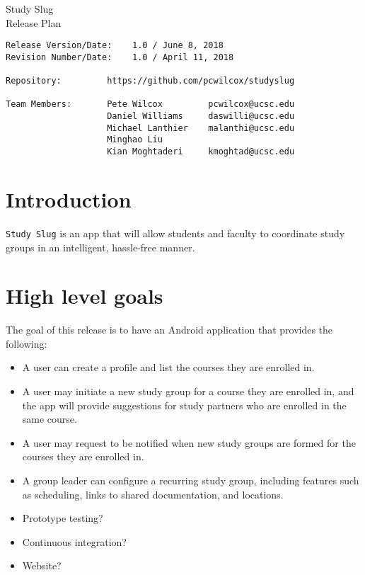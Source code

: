 \documentclass[10pt]{article}
\begin{document}
    
    \begin{center}
        \Huge{Study Slug} \\
        \Large{Release Plan}
    \end{center}
    \begin{verbatim}
Release Version/Date:    1.0 / June 8, 2018        
Revision Number/Date:    1.0 / April 11, 2018

Repository:         https://github.com/pcwilcox/studyslug

Team Members:       Pete Wilcox         pcwilcox@ucsc.edu    
                    Daniel Williams     daswilli@ucsc.edu  
                    Michael Lanthier    malanthi@ucsc.edu  
                    Minghao Liu         
                    Kian Moghtaderi     kmoghtad@ucsc.edu
    \end{verbatim}
    
    \section{Introduction}
    \texttt{Study Slug} is an app that will allow students and faculty to coordinate study groups in an intelligent, hassle-free manner.
    
    \section{High level goals}
    The goal of this release is to have an Android application that provides the following:
    \begin{itemize}
        \item A user can create a profile and list the courses they are enrolled in.
        \item A user may initiate a new study group for a course they are enrolled in, and the app will provide suggestions for study partners who are enrolled in the same course.
        \item A user may request to be notified when new study groups are formed for the courses they are enrolled in.
        \item A group leader can configure a recurring study group, including features such as scheduling, links to shared documentation, and locations.
        \item Prototype testing?
        \item Continuous integration?
        \item Website?
    \end{itemize}
    
\end{document}
